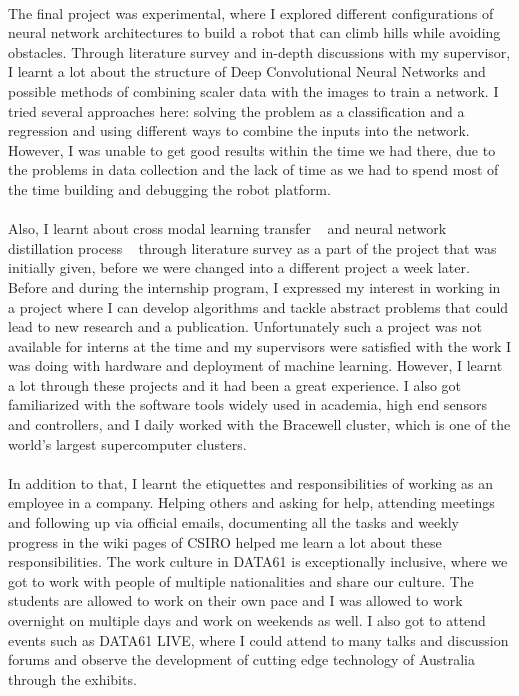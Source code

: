 \paragraph{}
The final project was experimental, where I explored different configurations of neural network architectures to build a robot that can climb hills while avoiding obstacles. Through literature survey and in-depth discussions with my supervisor, I learnt a lot about the structure of Deep Convolutional Neural Networks and possible methods of combining scaler data with the images to train a network. I tried several approaches here: solving the problem as a classification and a regression and using different ways to combine the inputs into the network. However, I was unable to get good results within the time we had there, due to the problems in data collection and the lack of time as we had to spend most of the time building and debugging the robot platform.

\paragraph{}
Also, I learnt about cross modal learning transfer ~\cite{cross_modal2} and neural network distillation process ~\cite{distill2} through literature survey as a part of the project that was initially given, before we were changed into a different project a week later. Before and during the internship program, I expressed my interest in working in a project where I can develop algorithms and tackle abstract problems that could lead to new research and a publication. Unfortunately such a project was not available for interns at the time and my supervisors were satisfied with the work I was doing with hardware and deployment of machine learning. However, I learnt a lot through these projects and it had been a great experience. I also got familiarized with the software tools widely used in academia, high end sensors and controllers, and I daily worked with the Bracewell cluster, which is one of the world's largest supercomputer clusters. 

\paragraph{}
In addition to that, I learnt the etiquettes and responsibilities of working as an employee in a company. Helping others and asking for help, attending meetings and following up via official emails, documenting all the tasks and weekly progress in the wiki pages of CSIRO helped me learn a lot about these responsibilities. The work culture in DATA61 is exceptionally inclusive, where we got to work with people of multiple nationalities and share our culture. The students are allowed to work on their own pace and I was allowed to work overnight on multiple days and work on weekends as well. I also got to attend events such as DATA61 LIVE, where I could attend to many talks and discussion forums and observe the development of cutting edge technology of Australia through the exhibits.

